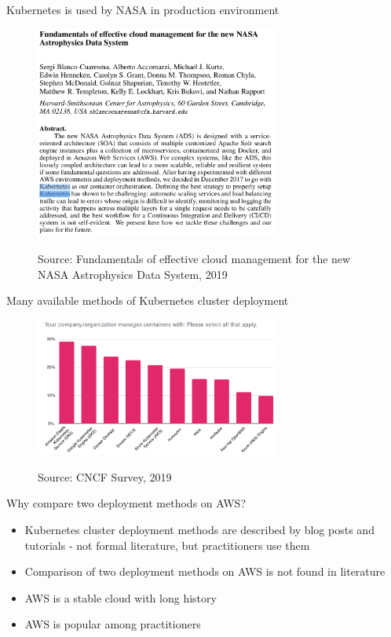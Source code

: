 \documentclass{beamer}
\newcommand{\source}[1]{\caption*{Source: {#1}} }
\begin{document}
\begin{frame}{Kubernetes is used by NASA in production environment}%
	\begin{figure}
		\includegraphics[width=8cm]{figures/k8s-used-by-nasa.png}
		\label{fig:k8s-used-by-nasa}
		\source{Fundamentals of effective cloud management for the new NASA Astrophysics Data System, 2019}
	\end{figure}
\end{frame}

\begin{frame}{Many available methods of Kubernetes cluster deployment}%
\begin{figure}
\includegraphics[width=8cm]{figures/cncf-k8s-deployment-methods.png}
\label{fig:cncf-k8s-deployment-methods}
\source{CNCF Survey, 2019}
\end{figure}
\end{frame}

\begin{frame}{Why compare two deployment methods on AWS?}%
	\begin{itemize}
		\item Kubernetes cluster deployment methods are described by blog posts and tutorials - not formal literature, but practitioners use them
		\item Comparison of two deployment methods on AWS is not found in literature
		\item AWS is a stable cloud with long history
		\item AWS is popular among practitioners
	\end{itemize}
\end{frame}
\end{document}
